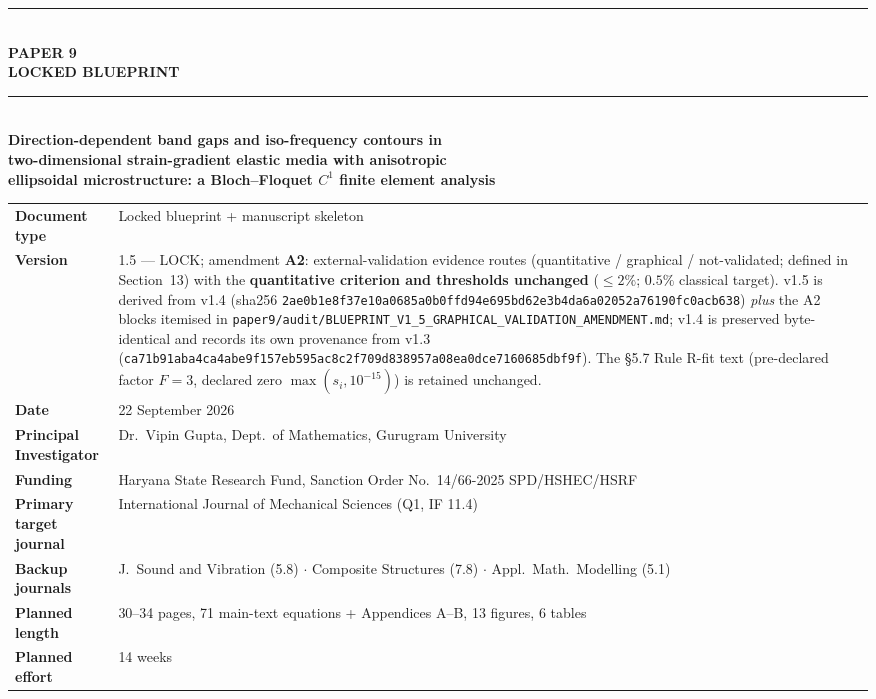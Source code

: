 \documentclass[11pt,a4paper]{article}
\begin{document}
\begin{titlepage}
\centering
\vspace*{0.6cm}
{\color{accent}\rule{\textwidth}{1.2pt}}\\[0.5cm]
{\Huge\bfseries\color{lockblue} PAPER 9}\\[0.35cm]
{\Large\bfseries LOCKED BLUEPRINT}\\[0.9cm]
{\color{accent}\rule{\textwidth}{0.6pt}}\\[1.1cm]

{\large\bfseries Direction-dependent band gaps and iso-frequency contours in\\[0.25cm]
two-dimensional strain-gradient elastic media with anisotropic\\[0.25cm]
ellipsoidal microstructure: a Bloch--Floquet $C^1$ finite element analysis}\\[1.3cm]

\begin{minipage}{0.86\textwidth}
\centering\footnotesize
\begin{tabular}{@{}>{\bfseries}p{3.5cm} p{9.6cm}@{}}
\textbf{Document type} & Locked blueprint + manuscript skeleton \\
\textbf{Version} & 1.5 --- LOCK; amendment \textbf{A2}: external-validation evidence routes (quantitative / graphical / not-validated; defined in Section~13) with the \textbf{quantitative criterion and thresholds unchanged} ($\le 2\%$; $0.5\%$ classical target). v1.5 is derived from v1.4 (sha256 \texttt{2ae0b1e8f37e10a0685a0b0ffd94e695bd62e3b4da6a02052a76190fc0acb638}) \emph{plus} the A2 blocks itemised in \texttt{paper9/audit/BLUEPRINT\_V1\_5\_GRAPHICAL\_VALIDATION\_AMENDMENT.md}; v1.4 is preserved byte-identical and records its own provenance from v1.3 (\texttt{ca71b91aba4ca4abe9f157eb595ac8c2f709d838957a08ea0dce7160685dbf9f}). The \S5.7 Rule R-fit text (pre-declared factor $F = 3$, declared zero $\max(s_i, 10^{-15})$) is retained unchanged. \\
\textbf{Date} & 22 September 2026 \\
\textbf{Principal Investigator} & Dr.\ Vipin Gupta, Dept.\ of Mathematics, Gurugram University \\
\textbf{Funding} & Haryana State Research Fund, Sanction Order No.\ 14/66-2025 SPD/HSHEC/HSRF \\
\textbf{Primary target journal} & International Journal of Mechanical Sciences (Q1, IF 11.4) \\
\textbf{Backup journals} & J.\ Sound and Vibration (5.8) $\cdot$ Composite Structures (7.8) $\cdot$ Appl.\ Math.\ Modelling (5.1) \\
\textbf{Planned length} & 30--34 pages, 71 main-text equations + Appendices A--B, 13 figures, 6 tables \\
\textbf{Planned effort} & 14 weeks \\
\end{tabular}
\end{minipage}


\end{titlepage}
\end{document}
